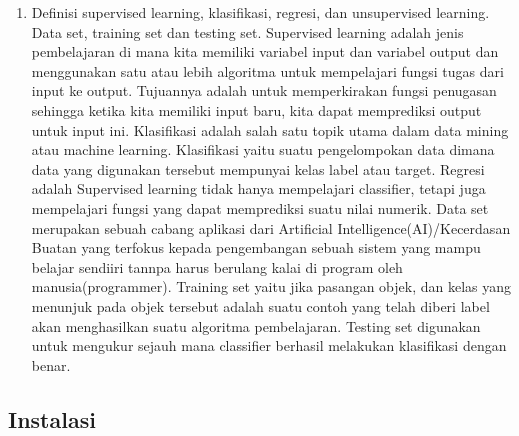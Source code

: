 \begin{enumerate}
\item  Definisi supervised learning, klasifikasi, regresi, dan unsupervised learning. Data set, training set dan testing set. 
\subitem Supervised learning adalah jenis pembelajaran di mana kita memiliki variabel input dan variabel output dan menggunakan satu atau lebih algoritma untuk mempelajari fungsi tugas dari input ke output. Tujuannya adalah untuk memperkirakan fungsi penugasan sehingga ketika kita memiliki input baru, kita dapat memprediksi output untuk input ini.
\subitem Klasifikasi adalah salah satu topik utama dalam data mining atau machine learning. Klasifikasi yaitu suatu pengelompokan data dimana data yang digunakan tersebut mempunyai kelas label atau target.
\subitem Regresi adalah Supervised learning tidak hanya mempelajari classifier, tetapi juga mempelajari fungsi yang dapat memprediksi suatu nilai numerik. 
\subitem Data set merupakan sebuah cabang aplikasi dari Artificial Intelligence(AI)/Kecerdasan Buatan yang terfokus kepada pengembangan sebuah sistem yang mampu belajar sendiiri tannpa harus berulang kalai di program oleh manusia(programmer).
\subitem Training set yaitu jika pasangan objek, dan kelas yang menunjuk pada objek tersebut adalah suatu contoh yang telah diberi label akan menghasilkan suatu algoritma pembelajaran.
\subitem Testing set digunakan untuk mengukur sejauh mana classifier berhasil melakukan klasifikasi dengan benar\cite{zhu2009introduction}.
\end{enumerate}

\subsection{Instalasi}
